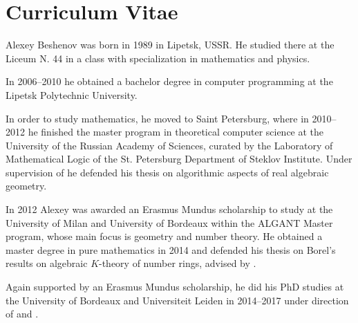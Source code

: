 \chapter*{Curriculum Vitae}

Alexey Beshenov was born in 1989 in Lipetsk, USSR. He studied there at the
Liceum N. 44 in a class with specialization in mathematics and physics.

In 2006--2010 he obtained a bachelor degree in computer programming at the
Lipetsk Polytechnic University.

In order to study mathematics, he moved to Saint Petersburg, where in 2010--2012
he finished the master program in theoretical computer science at the University
of the Russian Academy of Sciences, curated by the Laboratory of Mathematical
Logic of the St. Petersburg Department of Steklov Institute. Under supervision
of  he defended his thesis on algorithmic
aspects of real algebraic geometry.

In 2012 Alexey was awarded an Erasmus Mundus scholarship to study at the
University of Milan and University of Bordeaux within the ALGANT Master program,
whose main focus is geometry and number theory. He obtained a master degree in
pure mathematics in 2014 and defended his thesis on Borel's results on algebraic
$K$-theory of number rings, advised by .

Again supported by an Erasmus Mundus scholarship, he did his PhD studies at the
University of Bordeaux and Universiteit Leiden in 2014--2017 under direction of
 and .
